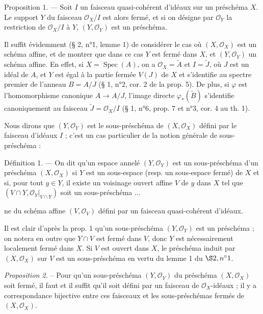 Proposition 1. — Soit $I$ un faisceau quasi-cohérent d'idéaux sur un préschéma $X$. Le support $Y$ du faisceau $\mathcal{O}_X/I$ est alors fermé, et si on désigne par $\mathcal{O}_Y$ la restriction de $\mathcal{O}_X/I$ à $Y$, $(Y, \mathcal{O}_Y)$ est un préschéma.

Il suffit évidemment (§ 2, n°1, lemme 1) de considérer le cas où $(X, \mathcal{O}_X)$ est un schéma affine, et de montrer que dans ce cas $Y$ est fermé dans $X$, et $(Y, \mathcal{O}_Y)$ un schéma affine. En effet, si $X = \operatorname{Spec}(A)$, on a $\mathcal{O}_X = \tilde{A}$ et $I = \tilde{J}$, où $J$ est un idéal de $A$, et $Y$ est égal à la partie fermée $V(J)$ de $X$ et s'identifie au spectre premier de l'anneau $B = A/J$ (§ 1, n°2, cor. 2 de la prop. 5). De plus, si $\varphi$ est l'homomorphisme canonique $A \to A/J$, l'image directe $\varphi_*(\tilde{B})$ s'identifie canoniquement au faisceau $\tilde{J} = \mathcal{O}_X/I$ (§ 1, n°6, prop. 7 et n°3, cor. 4 au th. 1).

Nous dirons que $(Y, \mathcal{O}_Y)$ est le sous-préschéma de $(X, \mathcal{O}_X)$ défini par le faisceau d'idéaux $I$ ; c'est un cas particulier de la notion générale de sous-préschéma :

Définition 1. — On dit qu'un espace annelé $(Y, \mathcal{O}_Y)$ est un sous-préschéma d'un préschéma $(X, \mathcal{O}_X)$ si $Y$ est un sous-espace (resp. un sous-espace fermé) de $X$ et si, pour tout $y \in Y$, il existe un voisinage ouvert affine $V$ de $y$ dans $X$ tel que $(V \cap Y, \mathcal{O}_Y|_{V \cap Y})$ soit un sous-préschéma ...

\newpage


ne du schéma affine $(V, \mathcal{O}_V)$ défini par un faisceau quasi-cohérent d'idéaux.

Il est clair d'après la prop. 1 qu'un sous-préschéma $(Y, \mathcal{O}_Y)$ est un préschéma ; on notera en outre que $Y \cap V$ est fermé dans $V$, donc $Y$ est nécessairement localement fermé dans $X$. Si $V$ est ouvert dans $X$, le préschéma induit par $(X, \mathcal{O}_X)$ sur $V$ est un sous-préschéma en vertu du lemme 1 du $\S 2, n^\circ 1$.

\emph{Proposition 2.} -- Pour qu'un sous-préschéma $(Y, \mathcal{O}_Y)$ du préschéma $(X, \mathcal{O}_X)$ soit fermé, il faut et il suffit qu'il soit défini par un faisceau de $\mathcal{O}_X$-idéaux ; il y a correspondance bijective entre ces faisceaux et les sous-préschémas fermés de $(X, \mathcal{O}_X)$.

